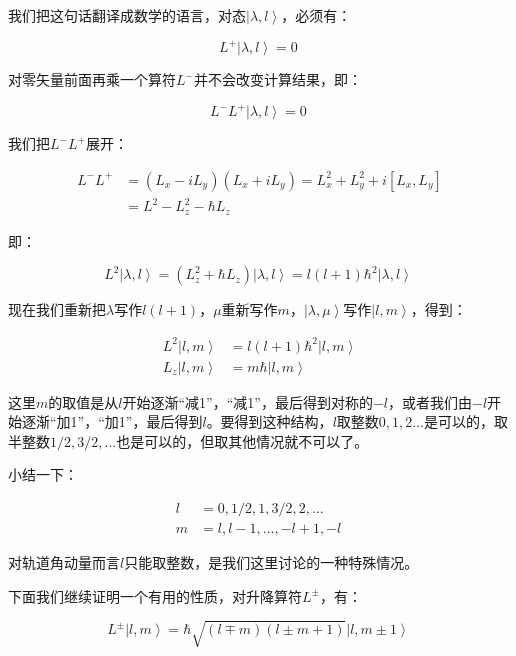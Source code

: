 我们把这句话翻译成数学的语言，对态$\left| \lambda, l \right\rangle$，必须有：

\begin{equation}
L^+ \left| \lambda, l \right\rangle = 0~
\end{equation}

对零矢量前面再乘一个算符$L^-$并不会改变计算结果，即：

\begin{equation}
L^- L^+ \left| \lambda, l \right\rangle = 0 ~
\end{equation}

我们把$L^- L^+$展开：

\begin{align}
L^- L^+ &= ( L_x - i L_y ) (L_x + i L_y) = L_x^2 + L_y^2 + i [ L_x, L_y ]\\ 
{} &= L^2 - L_z^2 - \hbar L_z~
\end{align}

即：

\begin{equation}
L^2 \left| \lambda, l \right\rangle = (L_z^2 + \hbar L_z) \left| \lambda, l \right\rangle = l (l + 1)\hbar^2 \left| \lambda, l \right\rangle~
\end{equation}

现在我们重新把$\lambda$写作$l (l +1)$，$\mu$重新写作$m$，$\left|  \lambda, \mu \right\rangle$写作$\left| l, m \right\rangle$，得到：

\begin{align}
L^2 \left| l,m \right\rangle &= l(l+1)\hbar^2 \left| l,m \right\rangle \\
L_z \left| l,m \right\rangle &= m \hbar \left| l,m \right\rangle~
\end{align}

这里$m$的取值是从$l$开始逐渐“减1”，“减1”，最后得到对称的$-l$，或者我们由$-l$开始逐渐“加1”，“加1”，最后得到$l$。要得到这种结构，$l$取整数$0, 1, 2 ...$是可以的，取半整数$1/2, 3/2, ...$也是可以的，但取其他情况就不可以了。

小结一下：

\begin{align}
l &= 0, 1/2, 1, 3/2, 2, ... \\
m &= l, l-1, ..., -l +1 , -l~
\end{align}

对轨道角动量而言$l$只能取整数，是我们这里讨论的一种特殊情况。

下面我们继续证明一个有用的性质，对升降算符$L^{\pm}$，有：

\begin{equation}
L^{\pm} \left| l,m \right\rangle = \hbar \sqrt{(l \mp m)(l \pm m +1)
} \left|l, m \pm 1 \right\rangle~
\end{equation}

